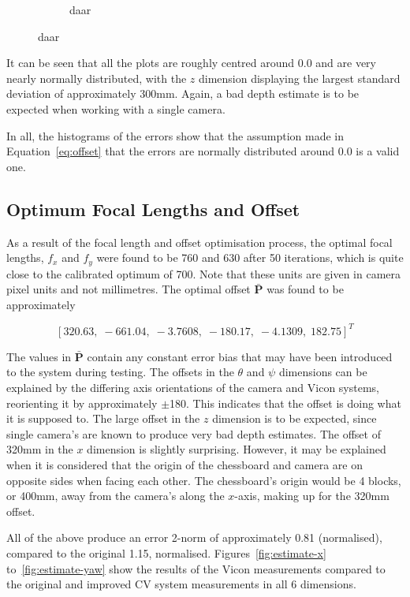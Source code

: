 \begin{figure}
\begin{subfigure}{0.45\textwidth}
     \caption{daar}
  \label{fig:norm-yaw}
  \end{subfigure}
\end{figure}

It can be seen that all the plots are roughly centred around 0.0 and are very nearly normally distributed, with the $z$ dimension displaying the largest standard deviation of approximately 300mm. Again, a bad depth estimate is to be expected when working with a single camera.

In all, the histograms of the errors show that the assumption made in Equation~\ref{eq:offset} that the errors are normally distributed around 0.0 is a valid one. 

\subsection{Optimum Focal Lengths and Offset}

As a result of the focal length and offset optimisation process, the optimal focal lengths, $f_x$ and $f_y$ were found to be 760 and 630 after 50 iterations, which is quite close to the calibrated optimum of 700. Note that these units are given in camera pixel units and not millimetres. The optimal offset $\bar{\bm{P}}$ was found to be approximately

\[
  {[320.63,\;-661.04,\;-3.7608,\;-180.17,\;-4.1309,\;182.75]}^T
\]

The values in $\bar{\bm{P}}$ contain any constant error bias that may have been introduced to the system during testing. The offsets in the $\theta$ and $\psi$ dimensions can be explained by the differing axis orientations of the camera and Vicon systems, reorienting it by approximately $\pm$180\degree. This indicates that the offset is doing what it is supposed to. The large offset in the $z$ dimension is to be expected, since single camera's are known to produce very bad depth estimates. The offset of 320mm in the $x$ dimension is slightly surprising. However, it may be explained when it is considered that the origin of the chessboard and camera are on opposite sides when facing each other. The chessboard's origin would be 4 blocks, or 400mm, away from the camera's along the $x$-axis, making up for the 320mm offset.

All of the above produce an error 2-norm of approximately 0.81 (normalised), compared to the original 1.15, normalised. Figures~\ref{fig:estimate-x} to~\ref{fig:estimate-yaw} show the results of the Vicon measurements compared to the original and improved CV system measurements in all 6 dimensions.

